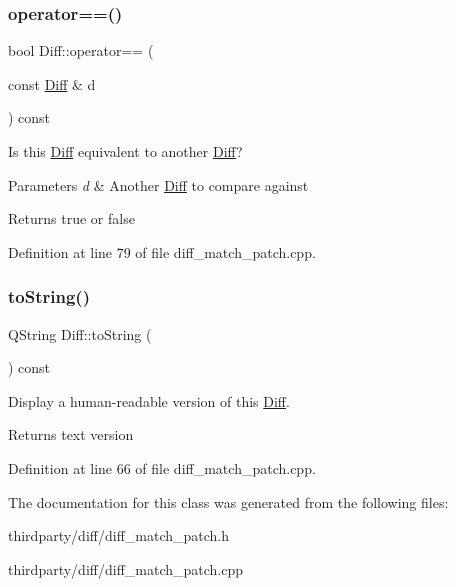 \subsubsection{\texorpdfstring{operator==()}{operator==()}}
{\footnotesize\ttfamily bool Diff\+::operator== (\begin{DoxyParamCaption}\item[{const \hyperlink{class_diff}{Diff} \&}]{d }\end{DoxyParamCaption}) const}

Is this \hyperlink{class_diff}{Diff} equivalent to another \hyperlink{class_diff}{Diff}? 
\begin{DoxyParams}{Parameters}
{\em d} & Another \hyperlink{class_diff}{Diff} to compare against \\
\hline
\end{DoxyParams}
\begin{DoxyReturn}{Returns}
true or false 
\end{DoxyReturn}


Definition at line 79 of file diff\+\_\+match\+\_\+patch.\+cpp.

\mbox{\label{class_diff_aeb7f4b886cc284169435173d53e71a0c}} 
\subsubsection{\texorpdfstring{to\+String()}{toString()}}
{\footnotesize\ttfamily Q\+String Diff\+::to\+String (\begin{DoxyParamCaption}{ }\end{DoxyParamCaption}) const}

Display a human-\/readable version of this \hyperlink{class_diff}{Diff}. \begin{DoxyReturn}{Returns}
text version 
\end{DoxyReturn}


Definition at line 66 of file diff\+\_\+match\+\_\+patch.\+cpp.



The documentation for this class was generated from the following files\+:\begin{DoxyCompactItemize}
\item 
thirdparty/diff/diff\+\_\+match\+\_\+patch.\+h\item 
thirdparty/diff/diff\+\_\+match\+\_\+patch.\+cpp\end{DoxyCompactItemize}
